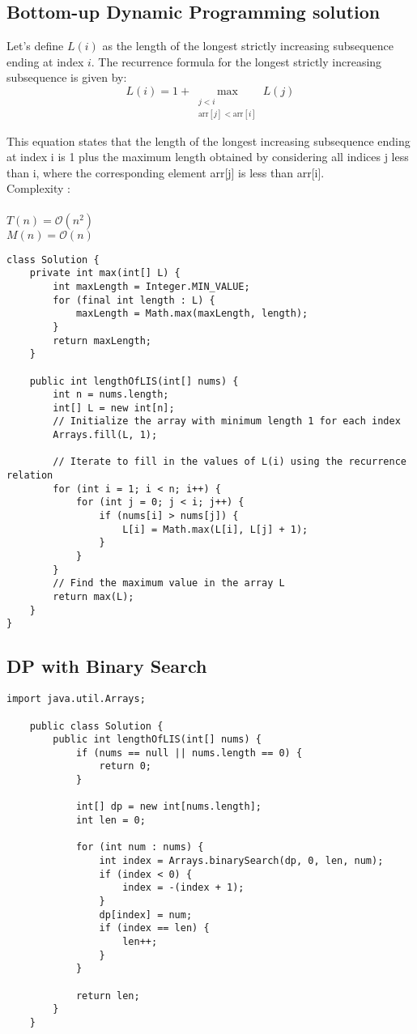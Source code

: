\documentclass{article}
\begin{document}
\clearpage %
    \subsection{Bottom-up Dynamic Programming solution}
    Let's define $L(i)$ as the length of the longest strictly increasing subsequence ending at index $i$.
    The recurrence formula for the longest strictly increasing subsequence is given by:
    \[ L(i) = 1 + \max_{\substack{j < i \\ \text{arr}[j] < \text{arr}[i]}} L(j) \]

    This equation states that the length of the longest increasing subsequence ending at index i is 1 plus the maximum length obtained by considering all indices j less than i, where the corresponding element arr[j] is less than arr[i].
    \\

    \noindent
    Complexity :\\
    \\
    \noindent
    $T(n) = \mathcal{O}(n^{2})$
    \\
    $M(n) = \mathcal{O}(n)$

    \begin{lstlisting}[caption=$\mathcal{O}(n^{2})$ DP solution]
class Solution {
	private int max(int[] L) {
		int maxLength = Integer.MIN_VALUE;
		for (final int length : L) {
			maxLength = Math.max(maxLength, length);
		}
		return maxLength;
	}
	
	public int lengthOfLIS(int[] nums) {
		int n = nums.length;
		int[] L = new int[n];
		// Initialize the array with minimum length 1 for each index
		Arrays.fill(L, 1);
		
		// Iterate to fill in the values of L(i) using the recurrence relation
		for (int i = 1; i < n; i++) {
			for (int j = 0; j < i; j++) {
				if (nums[i] > nums[j]) {
					L[i] = Math.max(L[i], L[j] + 1);
				}
			}
		}
		// Find the maximum value in the array L
		return max(L);
	}
}
    \end{lstlisting}

\clearpage %
    \subsection{DP with Binary Search}
    \begin{lstlisting}[caption=$\mathcal{O}(n\log_{}{n})$ DP with Binary Search]
	import java.util.Arrays;

	public class Solution {
		public int lengthOfLIS(int[] nums) {
			if (nums == null || nums.length == 0) {
				return 0;
			}

			int[] dp = new int[nums.length];
			int len = 0;

			for (int num : nums) {
				int index = Arrays.binarySearch(dp, 0, len, num);
				if (index < 0) {
					index = -(index + 1);
				}
				dp[index] = num;
				if (index == len) {
					len++;
				}
			}

			return len;
		}
	}
    \end{lstlisting}
\end{document}
